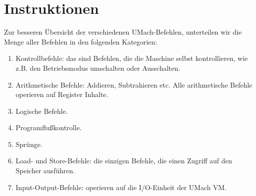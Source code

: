 \section{Instruktionen}

Zur besseren Übersicht der verschiedenen UMach-Befehlen, unterteilen wir die
Menge aller Befehlen in den folgenden Kategorien:

\begin{enumerate}
  \item Kontrollbefehle: das sind Befehlen, die die Maschine selbst
    kontrollieren, wie z.B. den Betriebsmodus umschalten oder Ausschalten.
  \item Arithmetische Befehle: Addieren, Subtrahieren etc. Alle arithmetische
    Befehle operieren auf Register Inhalte.
  \item Logische Befehle.
  \item Programflußkontrolle.
  \item Sprünge.
  \item Load- und Store-Befehle: die einzigen Befehle, die einen Zugriff auf den
    Speicher ausführen.
  \item Input-Output-Befehle: operieren auf die I/O-Einheit der UMach VM.
\end{enumerate}



\blindtext


